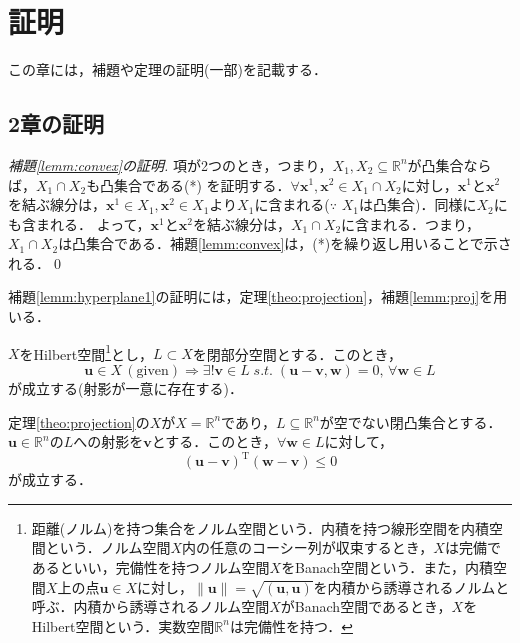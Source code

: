 \documentclass[dvipdfmx]{jsreport}
\begin{document}
\chapter{証明}
この章には，補題や定理の証明(一部)を記載する．
\section{2章の証明}
\begin{proof}[補題\ref{lemm:convex}の証明]
  項が2つのとき，つまり，$X_1, X_2 \subseteq \mathbb{R}^n$が凸集合ならば，$X_1 \cap X_2$も凸集合である(*)
  を証明する．$\forall \bm{x}^1, \bm{x}^2 \in X_1 \cap X_2$に対し，$\bm{x}^1$と$\bm{x}^2$を結ぶ線分は，$\bm{x}^1 \in X_1, \bm{x}^2 \in X_1$より$X_1$に含まれる($\because$ $X_1$は凸集合)．同様に$X_2$にも含まれる．
  よって，$\bm{x}^1$と$\bm{x}^2$を結ぶ線分は，$X_1 \cap X_2$に含まれる．つまり，$X_1 \cap X_2$は凸集合である．補題\ref{lemm:convex}は，(*)を繰り返し用いることで示される．\qed
\end{proof}

補題\ref{lemm:hyperplane1}の証明には，定理\ref{theo:projection}，補題\ref{lemm:proj}を用いる．

\begin{theo}[射影定理]\label{theo:projection}
  $X$をHilbert空間\footnote{距離(ノルム)を持つ集合をノルム空間という．内積を持つ線形空間を内積空間という．ノルム空間$X$内の任意のコーシー列が収束するとき，$X$は完備であるといい，完備性を持つノルム空間$X$をBanach空間という．また，内積空間$X$上の点$\bm{u} \in X$に対し，$\|\bm{u}\| = \sqrt{(\bm{u}, \bm{u})}$を内積から誘導されるノルムと呼ぶ．内積から誘導されるノルム空間$X$がBanach空間であるとき，$X$をHilbert空間という．実数空間$\mathbb{R}^n$は完備性を持つ．}とし，$L \subset X$を閉部分空間とする．このとき，
  \begin{equation}
    \bm{u} \in X \, (\mathrm{given}) \Rightarrow \exists! \bm{v} \in L \; s.t. \; (\bm{u} - \bm{v}, \bm{w}) = 0, \, \forall \bm{w} \in L \nonumber
  \end{equation}
  が成立する(射影が一意に存在する)．
\end{theo}

\begin{lemm}\label{lemm:proj}
    定理\ref{theo:projection}の$X$が$X = \mathbb{R}^n$であり，$L \subseteq \mathbb{R}^n$が空でない閉凸集合とする．$\bm{u} \in \mathbb{R}^n$の$L$への射影を$\bm{v}$とする．このとき，$\forall \bm{w} \in L$に対して，
  \begin{equation}\label{eq:proj}
    (\bm{u} - \bm{v})^{\mathrm{T}} (\bm{w} - \bm{v}) \leq 0
  \end{equation}
  が成立する．
\end{lemm}
\end{document}
